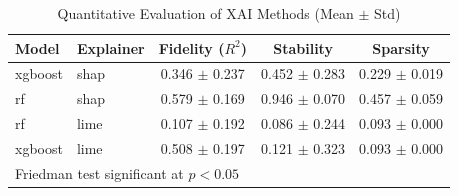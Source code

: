 \begin{table}[htbp]
\centering
\caption{Quantitative Evaluation of XAI Methods (Mean $\pm$ Std)}
\label{tab:xai_metrics}
\begin{tabular}{llccc}
\toprule
Model & Explainer & Fidelity ($R^2$) & Stability & Sparsity \\
\midrule
xgboost & shap & 0.346 $\pm$ 0.237 & 0.452 $\pm$ 0.283 & 0.229 $\pm$ 0.019 \\
rf & shap & 0.579 $\pm$ 0.169 & 0.946 $\pm$ 0.070 & 0.457 $\pm$ 0.059 \\
rf & lime & 0.107 $\pm$ 0.192 & 0.086 $\pm$ 0.244 & 0.093 $\pm$ 0.000 \\
xgboost & lime & 0.508 $\pm$ 0.197 & 0.121 $\pm$ 0.323 & 0.093 $\pm$ 0.000 \\
\bottomrule
\multicolumn{5}{l}{\footnotesize * Friedman test significant at $p < 0.05$} \\
\end{tabular}
\end{table}